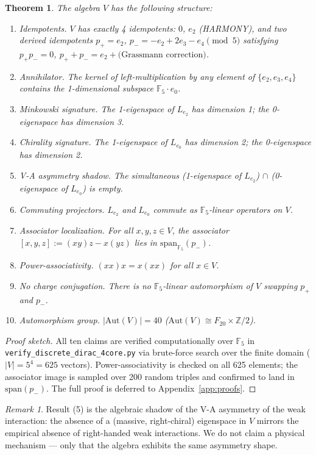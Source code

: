\documentclass[11pt]{amsart}
\theoremstyle{plain}
\newtheorem{theorem}{Theorem}[section]
\theoremstyle{definition}
\theoremstyle{remark}
\newtheorem*{remark}{Remark}
\newcommand{\Z}{\mathbb{Z}}
\newcommand{\F}{\mathbb{F}}
\newcommand{\Aut}{\mathrm{Aut}}
\begin{document}
\begin{theorem}\label{thm:dirac}
The algebra $V$ has the following structure:
\begin{enumerate}
\item \emph{Idempotents.} $V$ has exactly 4 idempotents: $0$, $e_2$ (HARMONY),
and two derived idempotents $p_+ = e_2$, $p_- = -e_2 + 2 e_3 - e_4 \pmod 5$
satisfying $p_+ p_- = 0$, $p_+ + p_- = e_2 + \text{(Grassmann correction)}$.
\item \emph{Annihilator.} The kernel of left-multiplication by any element
of $\{e_2, e_3, e_4\}$ contains the 1-dimensional subspace $\F_5 \cdot e_0$.
\item \emph{Minkowski signature.} The 1-eigenspace of $L_{e_2}$ has dimension 1;
the 0-eigenspace has dimension 3.
\item \emph{Chirality signature.} The 1-eigenspace of $L_{e_0}$ has dimension 2;
the 0-eigenspace has dimension 2.
\item \emph{V-A asymmetry shadow.} The simultaneous (1-eigenspace of $L_{e_2}$)
$\cap$ (0-eigenspace of $L_{e_0}$) is empty.
\item \emph{Commuting projectors.} $L_{e_2}$ and $L_{e_0}$ commute as
$\F_5$-linear operators on $V$.
\item \emph{Associator localization.} For all $x,y,z \in V$, the associator
$[x,y,z] := (xy)z - x(yz)$ lies in $\mathrm{span}_{\F_5}(p_-)$.
\item \emph{Power-associativity.} $(xx)x = x(xx)$ for all $x \in V$.
\item \emph{No charge conjugation.} There is no $\F_5$-linear automorphism of $V$
swapping $p_+$ and $p_-$.
\item \emph{Automorphism group.} $|\Aut(V)| = 40$ ($\Aut(V) \cong F_{20} \times \Z/2$).
\end{enumerate}
\end{theorem}

\begin{proof}[Proof sketch]
All ten claims are verified computationally over $\F_5$ in
\texttt{verify\_discrete\_dirac\_4core.py} via brute-force search over the
finite domain ($|V| = 5^4 = 625$ vectors). Power-associativity is checked
on all 625 elements; the associator image is sampled over 200 random triples
and confirmed to land in $\mathrm{span}(p_-)$. The full proof is deferred to
Appendix~\ref{app:proofs}.
\end{proof}

\begin{remark}
Result (5) is the algebraic shadow of the V-A asymmetry of the weak
interaction: the absence of a (massive, right-chiral) eigenspace in $V$
mirrors the empirical absence of right-handed weak interactions. We do not
claim a physical mechanism --- only that the algebra exhibits the same
asymmetry shape.
\end{remark}
\end{document}
